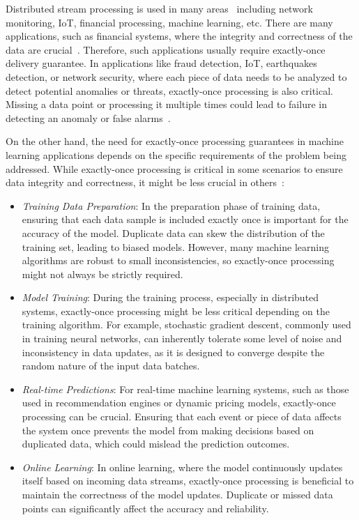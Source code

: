 Distributed stream processing is used in many areas~\cite{fragkoulis2024survey} including network monitoring, IoT, financial processing, machine learning, etc. There are many applications, such as financial systems, where the integrity and correctness of the data are crucial~\cite{zhang2024survey}. Therefore, such applications usually require exactly-once delivery guarantee. In applications like fraud detection, IoT, earthquakes detection, or network security, where each piece of data needs to be analyzed to detect potential anomalies or threats, exactly-once processing is also critical. Missing a data point or processing it multiple times could lead to failure in detecting an anomaly or false alarms~\cite{zhou2019scalable, diro2024anomaly, 10.1093/gji/ggac355, geldenhuys2021dependable}.

On the other hand, the need for exactly-once processing guarantees in machine learning applications depends on the specific requirements of the problem being addressed. While exactly-once processing is critical in some scenarios to ensure data integrity and correctness, it might be less crucial in others~\cite{boden2017distributed, webirte}:
\begin{itemize}
    \item {\em Training Data Preparation}: In the preparation phase of training data, ensuring that each data sample is included exactly once is important for the accuracy of the model. Duplicate data can skew the distribution of the training set, leading to biased models. However, many machine learning algorithms are robust to small inconsistencies, so exactly-once processing might not always be strictly required.
    \item {\em Model Training}: During the training process, especially in distributed systems, exactly-once processing might be less critical depending on the training algorithm. For example, stochastic gradient descent, commonly used in training neural networks, can inherently tolerate some level of noise and inconsistency in data updates, as it is designed to converge despite the random nature of the input data batches.
    \item {\em Real-time Predictions}: For real-time machine learning systems, such as those used in recommendation engines or dynamic pricing models, exactly-once processing can be crucial. Ensuring that each event or piece of data affects the system once prevents the model from making decisions based on duplicated data, which could mislead the prediction outcomes.
    \item {\em Online Learning}: In online learning, where the model continuously updates itself based on incoming data streams, exactly-once processing is beneficial to maintain the correctness of the model updates. Duplicate or missed data points can significantly affect the accuracy and reliability.
\end{itemize}

